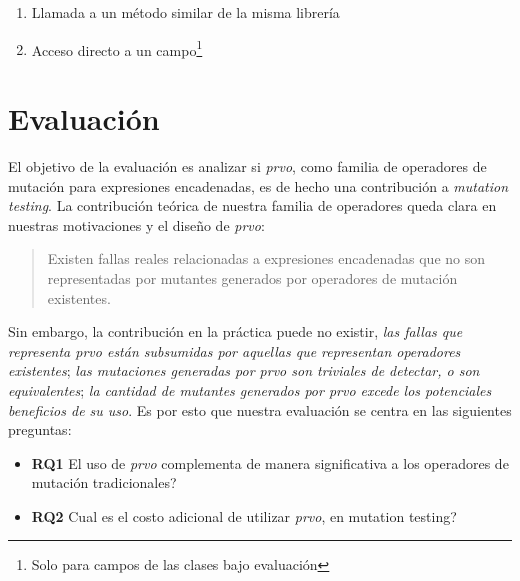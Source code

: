 \begin{enumerate}[label=\arabic*), leftmargin=.75cm,align=left]
	\item Llamada a un m\'etodo similar de la misma librer\'ia
	\item Acceso directo a un campo\footnote{Solo para campos de las clases bajo evaluaci\'on}
\end{enumerate}


\section{Evaluaci\'on}

El objetivo de la evaluaci\'on es analizar si \emph{prvo}, como familia de operadores de mutaci\'on para expresiones encadenadas, es de hecho una contribuci\'on a \emph{mutation testing}. La contribuci\'on te\'orica de nuestra familia de operadores queda clara en nuestras motivaciones y el dise\~no de \emph{prvo}:
\begin{quote}
  Existen fallas reales relacionadas a expresiones encadenadas que no son representadas por mutantes generados por operadores de mutaci\'on existentes.
\end{quote}
Sin embargo, la contribuci\'on en la pr\'actica puede no existir, \emph{las fallas que representa prvo est\'an subsumidas por aquellas que representan operadores existentes}; \emph{las mutaciones generadas por prvo son triviales de detectar, o son equivalentes}; \emph{la cantidad de mutantes generados por prvo excede los potenciales beneficios de su uso}. Es por esto que nuestra evaluaci\'on se centra en las siguientes preguntas:
\begin{itemize}
	\item \textbf{RQ1} El uso de \emph{prvo} complementa de manera significativa a los operadores de mutaci\'on tradicionales?
	
	\item \textbf{RQ2} Cual es el costo adicional de utilizar \emph{prvo}, en mutation testing?
\end{itemize}

